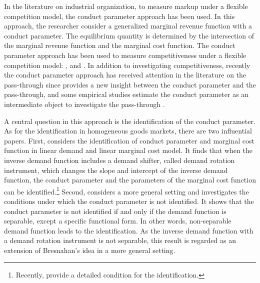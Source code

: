 \documentclass[11pt, a4paper]{article}
\theoremstyle{remark}
\begin{document}
In the literature on industrial organization, to measure markup under a flexible competition model, the conduct parameter approach has been used.
In this approach, the researcher consider a generalized marginal revenue function with a conduct parameter. 
The equilibrium quantity is determined by the intersection of the marginal revenue function and the marginal cost function.
The conduct parameter approach has been used to measure competitiveness under a flexible competition model: \citet{porterStudy1983}, \citet{genesove1998testing} and \citet{okazaki2022excess}.
In addition to investigating competitiveness, recently the conduct parameter approach has received attention in the literature on the pass-through since \citet{weylPassThrough2013} provides a new insight between the conduct parameter and the pass-through, and some empirical studies estimate the conduct parameter as an intermediate object to investigate the pass-through \citep{millerPassthrough2017}.

A central question in this approach is the identification of the conduct parameter.
As for the identification in homogeneous goods markets, there are two influential papers.
First, \citet{bresnahan1982oligopoly} considers the identification of conduct parameter and marginal cost function in linear demand and linear marginal cost model.
It finds that when the inverse demand function includes a demand shifter, called demand rotation instrument, which changes the slope and intercept of the inverse demand function, the conduct parameter and the parameters of the marginal cost function can be identified.\footnote{Recently, \citet{matsumura2023resolving} provide a detailed condition for the identification.}
Second, \citet{lau1982identifying} considers a more general setting and investigates the conditions under which the conduct parameter is not identified.
It shows that the conduct parameter is not identified if and only if the demand function is separable, except a specific functional form.
In other words, non-separable demand function leads to the identification.
As the inverse demand function with a demand rotation instrument is not separable, this result is regarded as an extension of Bresnahan's idea in a more general setting.
\end{document}
